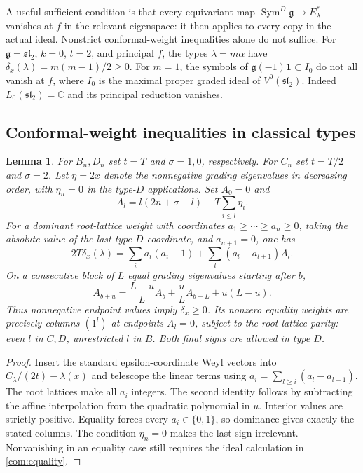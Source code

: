 \documentclass[11pt,a4paper]{amsart}
\numberwithin{equation}{section}
\newtheorem{lemma}[theorem]{Lemma}
\theoremstyle{definition}
\theoremstyle{remark}
\newcommand{\C}{\mathbb C}
\newcommand{\g}{\mathfrak g}
\newcommand{\slg}{\mathfrak{sl}}
\newcommand{\Sym}{\operatorname{Sym}}
\begin{document}
A useful sufficient condition is that every equivariant map
$\Sym^D\g\to E_\lambda^*$ vanishes at $f$ in the relevant
eigenspace: it then applies to every copy in the actual ideal.
Nonstrict conformal-weight inequalities alone do not suffice. For
$\g=\slg_2$, $k=0$, $t=2$, and principal $f$, the types
$\lambda=m\alpha$ have $\delta_x(\lambda)=m(m-1)/2\ge0$.
For $m=1$, the symbols of $\g(-1)\mathbf1\subset I_0$ do not all
vanish at $f$, where $I_0$ is the maximal proper graded ideal of $V^0(\slg_2)$. Indeed $L_0(\slg_2)=\C$ and its principal
reduction vanishes.

\subsection{Conformal-weight inequalities in classical types}
\begin{lemma}\label{v3:master-energy}
For $B_n,D_n$ set $t=T$ and $\sigma=1,0$, respectively. For $C_n$
set $t=T/2$ and $\sigma=2$. Let $\eta=2x$ denote the nonnegative
grading eigenvalues in decreasing order, with $\eta_n=0$ in the type-$D$ applications.
Set $A_0=0$ and
$$
 A_l=l(2n+\sigma-l)-T\sum_{i\le l}\eta_i.
$$
For a dominant root-lattice weight with coordinates
$a_1\ge\cdots\ge a_n\ge0$, taking the absolute value of the last
type-$D$ coordinate, and $a_{n+1}=0$, one has
$$
 2T\delta_x(\lambda)=\sum_i a_i(a_i-1)
              +\sum_l(a_l-a_{l+1})A_l.
$$
On a consecutive block of $L$ equal grading eigenvalues starting after $b$,
$$
 A_{b+u}=\frac{L-u}{L}A_b+\frac uL A_{b+L}+u(L-u).
$$
Thus nonnegative endpoint values imply $\delta_x\ge0$. Its nonzero
equality weights are precisely columns $(1^l)$ at endpoints $A_l=0$,
subject to the root-lattice parity: even $l$ in $C,D$, unrestricted
$l$ in $B$. Both final signs are allowed in type $D$.
\end{lemma}
\begin{proof}
Insert the standard epsilon-coordinate Weyl vectors into
$C_\lambda/(2t)-\lambda(x)$ and telescope the linear terms using
$a_i=\sum_{l\ge i}(a_l-a_{l+1})$. The root lattices make all $a_i$
integers. The second identity follows by subtracting the affine
interpolation from the quadratic polynomial in $u$. Interior values
are strictly positive. Equality forces every $a_i\in\{0,1\}$,
so dominance gives exactly the stated columns. The condition
$\eta_n=0$ makes the last sign irrelevant. Nonvanishing in an equality
case still requires the ideal calculation in \cref{com:equality}.
\end{proof}
\end{document}
